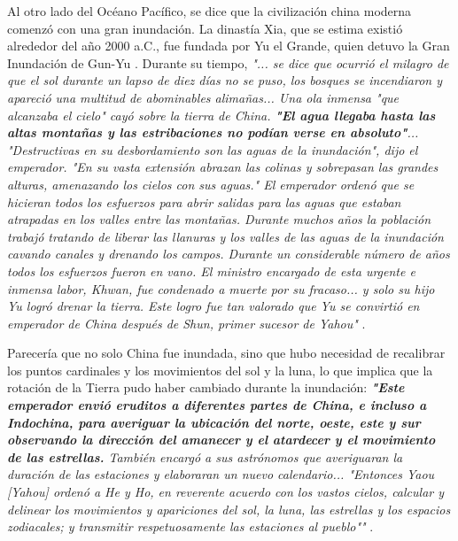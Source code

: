 \documentclass[10pt,twocolumn,letterpaper]{article}
\begin{document}
Al otro lado del Océano Pacífico, se dice que la civilización china moderna comenzó con una gran inundación. La dinastía Xia, que se estima existió alrededor del año 2000 a.C., fue fundada por Yu el Grande, quien detuvo la Gran Inundación de Gun-Yu \cite{6}. Durante su tiempo, \textit{"... se dice que ocurrió el milagro de que el sol durante un lapso de diez días no se puso, los bosques se incendiaron y apareció una multitud de abominables alimañas... Una ola inmensa "que alcanzaba el cielo" cayó sobre la tierra de China. \textbf{"El agua llegaba hasta las altas montañas y las estribaciones no podían verse en absoluto"}... "Destructivas en su desbordamiento son las aguas de la inundación", dijo el emperador. "En su vasta extensión abrazan las colinas y sobrepasan las grandes alturas, amenazando los cielos con sus aguas." El emperador ordenó que se hicieran todos los esfuerzos para abrir salidas para las aguas que estaban atrapadas en los valles entre las montañas. Durante muchos años la población trabajó tratando de liberar las llanuras y los valles de las aguas de la inundación cavando canales y drenando los campos. Durante un considerable número de años todos los esfuerzos fueron en vano. El ministro encargado de esta urgente e inmensa labor, Khwan, fue condenado a muerte por su fracaso... y solo su hijo Yu logró drenar la tierra. Este logro fue tan valorado que Yu se convirtió en emperador de China después de Shun, primer sucesor de Yahou"} \cite{5}.

Parecería que no solo China fue inundada, sino que hubo necesidad de recalibrar los puntos cardinales y los movimientos del sol y la luna, lo que implica que la rotación de la Tierra pudo haber cambiado durante la inundación: \textit{\textbf{"Este emperador envió eruditos a diferentes partes de China, e incluso a Indochina, para averiguar la ubicación del norte, oeste, este y sur observando la dirección del amanecer y el atardecer y el movimiento de las estrellas.} También encargó a sus astrónomos que averiguaran la duración de las estaciones y elaboraran un nuevo calendario... "Entonces Yaou [Yahou] ordenó a He y Ho, en reverente acuerdo con los vastos cielos, calcular y delinear los movimientos y apariciones del sol, la luna, las estrellas y los espacios zodiacales; y transmitir respetuosamente las estaciones al pueblo""} \cite{5}.
\end{document}
